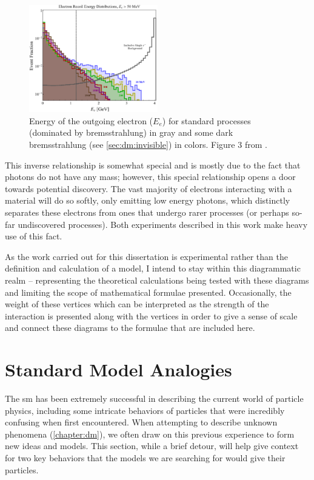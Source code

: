 \begin{figure}
	\centering
	\includegraphics[width=0.5\textwidth]{figures/intro/photon-reject-fig-3-recoil-electron-energy.png}
	\caption{
		Energy of the outgoing electron ($E_e$) for standard processes (dominated by bremsstrahlung)
		in gray and some dark bremsstrahlung (see \cref{sec:dm:invisible}) in colors.
		Figure 3 from \cite{ldmx-photon-reject-2020}.
	}
	\label{fig:recoil-electron-energy}
\end{figure}

This inverse relationship is somewhat special and is mostly due to the fact that photons
do not have any mass; however, this special relationship opens a door towards potential
discovery. The vast majority of electrons interacting with a material will do so softly,
only emitting low energy photons, which distinctly separates these electrons from ones
that undergo rarer processes (or perhaps so-far undiscovered processes). Both experiments
described in this work make heavy use of this fact.

As the work carried out for this dissertation is experimental rather than the definition and
calculation of a model, I intend to stay within this diagrammatic realm -- representing the theoretical
calculations being tested with these diagrams and limiting the scope of mathematical formulae
presented. Occasionally, the weight of these vertices which can be interpreted as the strength
of the interaction is presented along with the vertices in order to give a sense of scale
and connect these diagrams to the formulae that are included here.

\section{Standard Model Analogies}
The \ac{sm} has been extremely successful in describing the current world of particle physics,
including some intricate behaviors of particles that were incredibly confusing when first
encountered.
When attempting to describe unknown phenomena (\cref{chapter:dm}), we often draw on this
previous experience to form new ideas and models.
This section, while a brief detour, will help give context for two key behaviors that
the models we are searching for would give their particles.

